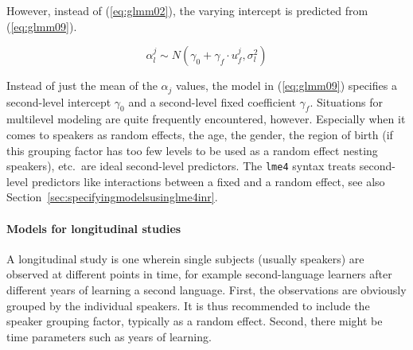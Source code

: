 \documentclass[a4paper,12pt]{article}
\begin{document}
However, instead of (\ref{eq:glmm02}), the varying intercept is predicted from (\ref{eq:glmm09}).

\begin{equation}
  \alpha_l^j\sim N(\gamma_0+\gamma_f\cdot u_f^j,\sigma_l^2)
  \label{eq:glmm09}
\end{equation}

Instead of just the mean of the $\alpha_j$ values, the model in (\ref{eq:glmm09}) specifies a second-level intercept $\gamma_0$ and a second-level fixed coefficient $\gamma_f$.
Situations for multilevel modeling are quite frequently encountered, however.
Especially when it comes to speakers as random effects, the age, the gender, the region of birth (if this grouping factor has too few levels to be used as a random effect nesting speakers), etc.\ are ideal second-level predictors.
The \texttt{lme4} syntax treats second-level predictors like interactions between a fixed and a random effect, see also Section~\ref{sec:specifyingmodelsusinglme4inr}.

%  

\paragraph{Models for longitudinal studies}

A longitudinal study is one wherein single subjects (usually speakers) are observed at different points in time, for example second-language learners after different years of learning a second language.
First, the observations are obviously grouped by the individual speakers.
It is thus recommended to include the speaker grouping factor, typically as a random effect.
Second, there might be time parameters such as years of learning.
\end{document}
